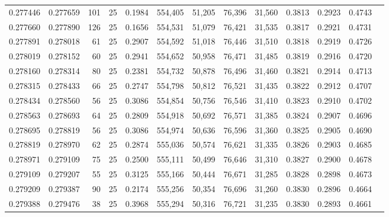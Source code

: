 \begin{tabular}{rrrrrrrrrrrrr}
0.277446 & 0.277659 &   101 &  25 &                                     0.1984 & 554,405 &  51,205 &  76,396 &  31,560 & 0.3813 & 0.2923 & 0.4743 \\
0.277660 & 0.277890 &   126 &  25 &                                     0.1656 & 554,531 &  51,079 &  76,421 &  31,535 & 0.3817 & 0.2921 & 0.4731 \\
0.277891 & 0.278018 &    61 &  25 &                                     0.2907 & 554,592 &  51,018 &  76,446 &  31,510 & 0.3818 & 0.2919 & 0.4726 \\
0.278019 & 0.278152 &    60 &  25 &                                     0.2941 & 554,652 &  50,958 &  76,471 &  31,485 & 0.3819 & 0.2916 & 0.4720 \\
0.278160 & 0.278314 &    80 &  25 &                                     0.2381 & 554,732 &  50,878 &  76,496 &  31,460 & 0.3821 & 0.2914 & 0.4713 \\
0.278315 & 0.278433 &    66 &  25 &                                     0.2747 & 554,798 &  50,812 &  76,521 &  31,435 & 0.3822 & 0.2912 & 0.4707 \\
0.278434 & 0.278560 &    56 &  25 &                                     0.3086 & 554,854 &  50,756 &  76,546 &  31,410 & 0.3823 & 0.2910 & 0.4702 \\
0.278563 & 0.278693 &    64 &  25 &                                     0.2809 & 554,918 &  50,692 &  76,571 &  31,385 & 0.3824 & 0.2907 & 0.4696 \\
0.278695 & 0.278819 &    56 &  25 &                                     0.3086 & 554,974 &  50,636 &  76,596 &  31,360 & 0.3825 & 0.2905 & 0.4690 \\
0.278819 & 0.278970 &    62 &  25 &                                     0.2874 & 555,036 &  50,574 &  76,621 &  31,335 & 0.3826 & 0.2903 & 0.4685 \\
0.278971 & 0.279109 &    75 &  25 &                                     0.2500 & 555,111 &  50,499 &  76,646 &  31,310 & 0.3827 & 0.2900 & 0.4678 \\
0.279109 & 0.279207 &    55 &  25 &                                     0.3125 & 555,166 &  50,444 &  76,671 &  31,285 & 0.3828 & 0.2898 & 0.4673 \\
0.279209 & 0.279387 &    90 &  25 &                                     0.2174 & 555,256 &  50,354 &  76,696 &  31,260 & 0.3830 & 0.2896 & 0.4664 \\
0.279388 & 0.279476 &    38 &  25 &                                     0.3968 & 555,294 &  50,316 &  76,721 &  31,235 & 0.3830 & 0.2893 & 0.4661 \\

\end{tabular}
